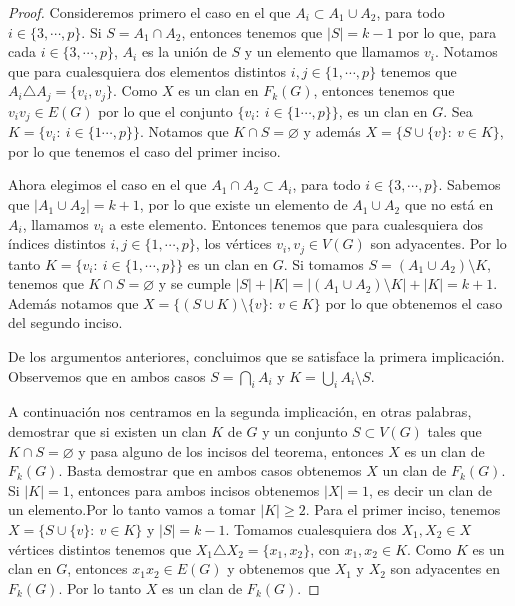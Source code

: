 \begin{proof}
        Consideremos primero el caso en el que $A_i \subset A_1\cup A_2$, para
        todo $i\in \{3, \cdots, p\}$. Si $S= A_1 \cap A_2$, entonces tenemos que
        $|S| =k-1$ por lo que, para cada $i \in \{3, \cdots, p\}$, $A_i$ es la
        uni\'on de $S$ y un elemento que llamamos $v_i$. Notamos que para
        cualesquiera dos elementos distintos $i, j \in \{1, \cdots, p\}$ tenemos
        que $A_i \triangle A_j = \{v_i, v_j\}$. Como $X$ es un clan en $F_k(G)$,
        entonces tenemos que $v_i{v_j} \in E(G)$ por lo que el conjunto
        $\{v_i\colon\ i \in \{1 \cdots, p\}\}$, es un clan en $G$.   Sea $K =
        \{v_i\colon\ i \in \{1 \cdots, p\}\}$.  Notamos que  $K \cap S = \varnothing$ y
        adem\'as $X= \{S \cup \{v\}\colon\ v \in K\}$, por lo que tenemos el caso del
        primer inciso.

        Ahora elegimos el caso en el que $A_1 \cap A_2 \subset A_i$, para todo
        $i\in \{3, \cdots, p\}$. Sabemos que $|A_1 \cup A_2| = k+1$, por lo que
        existe un elemento de $A_1 \cup A_2$ que no est\'a en $A_i$, llamamos
        $v_i$ a este elemento. Entonces tenemos que para cualesquiera dos
        \'indices distintos $i, j \in \{1, \cdots, p\}$, los v\'ertices $v_i, v_j
        \in V(G)$ son adyacentes. Por lo tanto $K= \{v_i\colon\ i \in \{1, \cdots,
        p\}\}$ es un clan en $G$. Si tomamos $S= (A_1 \cup A_2)\setminus K$,
        tenemos que $K \cap S = \varnothing$ y se cumple $|S| + |K|= |(A_1 \cup
        A_2)\setminus K| + |K| = k+1$. Adem\'as notamos que $X = \{(S \cup
        K)\setminus \{v\}\colon\ v\in K\}$ por lo que obtenemos el caso del segundo
        inciso.

        De los argumentos anteriores, concluimos que se satisface la primera
        implicaci\'on. Observemos que en ambos casos $S = \bigcap\limits_{i}
        A_i$ y $K = \bigcup\limits_{i} A_i \setminus S$.
        
        A continuaci\'on nos centramos en la segunda implicaci\'on, en otras
        palabras, demostrar que si existen un clan $K$ de $G$ y un conjunto $S
        \subset V(G)$ tales que $K \cap S = \varnothing$ y pasa alguno de los
        incisos del teorema, entonces $X$ es un clan de $F_k(G)$. Basta
        demostrar que en ambos casos obtenemos $X$ un clan de $F_k(G)$. Si $|K|
        =1$, entonces para ambos incisos obtenemos $|X| =1$, es decir un clan de
        un elemento.Por lo tanto vamos a tomar $|K| \geq 2$. Para el primer
        inciso, tenemos $X = \{S \cup \{v\}\colon\ v \in K\}$ y $|S| = k-1$. Tomamos
        cualesquiera dos $X_1, X_2 \in X$ v\'ertices distintos tenemos que $X_1
        \triangle X_2 =\{x_1, x_2\}$, con $x_1, x_2 \in K$. Como $K$ es un clan
        en $G$, entonces $x_1x_2 \in E(G)$ y obtenemos que $X_1$ y $X_2$ son
        adyacentes en $F_k(G)$. Por lo tanto $X$ es un clan de $F_k(G)$.


\end{proof}
